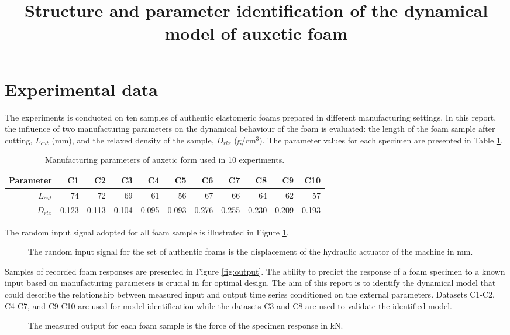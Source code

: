 \documentclass[a4paper,11pt,twoside]{article}
\title{Structure and parameter identification of the dynamical model of auxetic foam}
\theoremstyle{mytheoremstyle}
\begin{document}
	\maketitle
%	
\section{Experimental data}
\par The experiments is conducted on ten samples of authentic elastomeric foams prepared in different manufacturing settings. In this report, the influence of two manufacturing parameters on the dynamical behaviour of the foam is evaluated: the length of the foam sample after cutting, $L_{cut}$ (mm), and the relaxed density of the sample, $D_{rlx}$ (g/cm$^3$). The parameter values for each specimen are presented in Table \ref{tab:externparams}.
\begin{table}[!h]
	\centering
	\caption{Manufacturing parameters of auxetic form used in 10 experiments.}\label{tab:externparams}
	\scriptsize
	\begin{tabular}{rrrrrrrrrrr}
		Parameter  & C1 & C2 & C3 & C4 & C5 & C6 & C7 & C8 & C9 & C10 \\ 
		\hline 
		$L_{cut}$ & 74 & 72 & 69 & 61 & 56 & 67 & 66 & 64 & 62 & 57 \\ 
		$D_{rlx}$ & 0.123 & 0.113 & 0.104 & 0.095 & 0.093 & 0.276 & 0.255 & 0.230 & 0.209 & 0.193 \\ 
		\hline 
	\end{tabular}
\end{table}
The random input signal adopted for all foam sample is illustrated in Figure \ref{fig:input}. 
\begin{figure}[!h]
	\centering
	
	\caption{The random input signal for the set of authentic foams is the displacement of the hydraulic actuator of the machine in mm.}\label{fig:input}
\end{figure}
Samples of recorded foam responses are presented in  Figure \ref{fig:output}. The ability to predict the response of a foam specimen to a known input based on manufacturing parameters is crucial in for optimal design. The aim of this report is to identify the dynamical model that could describe the relationship between measured input and output time series conditioned on the external parameters. Datasets C1-C2, C4-C7, and C9-C10 are used for model identification while the datasets C3 and C8 are used to validate the identified model.
\begin{figure}[!t]
	\centering
	
	\caption{The measured output for each foam sample is the force of the specimen response in kN.}
\end{figure}\label{fig:output}
\end{document}
